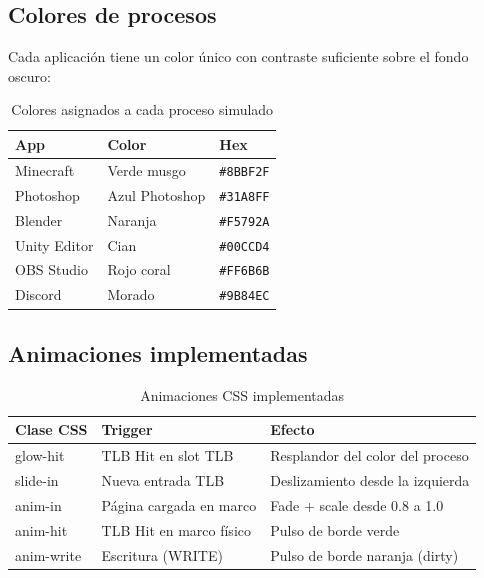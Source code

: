 \documentclass[12pt,a4paper]{article}
\begin{document}
\subsection{Colores de procesos}

Cada aplicación tiene un color único con contraste suficiente sobre el fondo oscuro:

\begin{table}[H]
\centering
\begin{tabular}{lll}
\toprule
\textbf{App} & \textbf{Color} & \textbf{Hex} \\
\midrule
Minecraft     & Verde musgo    & \texttt{\#8BBF2F} \\
Photoshop     & Azul Photoshop & \texttt{\#31A8FF} \\
Blender       & Naranja        & \texttt{\#F5792A} \\
Unity Editor  & Cian           & \texttt{\#00CCD4} \\
OBS Studio    & Rojo coral     & \texttt{\#FF6B6B} \\
Discord       & Morado         & \texttt{\#9B84EC} \\
\bottomrule
\end{tabular}
\caption{Colores asignados a cada proceso simulado}
\end{table}

\subsection{Animaciones implementadas}

\begin{table}[H]
\centering
\begin{tabular}{>{\ttfamily}lll}
\toprule
\textbf{Clase CSS} & \textbf{Trigger} & \textbf{Efecto} \\
\midrule
glow-hit   & TLB Hit en slot TLB      & Resplandor del color del proceso \\
slide-in   & Nueva entrada TLB        & Deslizamiento desde la izquierda \\
anim-in    & Página cargada en marco  & Fade + scale desde 0.8 a 1.0 \\
anim-hit   & TLB Hit en marco físico  & Pulso de borde verde \\
anim-write & Escritura (WRITE)        & Pulso de borde naranja (dirty) \\
\bottomrule
\end{tabular}
\caption{Animaciones CSS implementadas}
\end{table}
\end{document}
